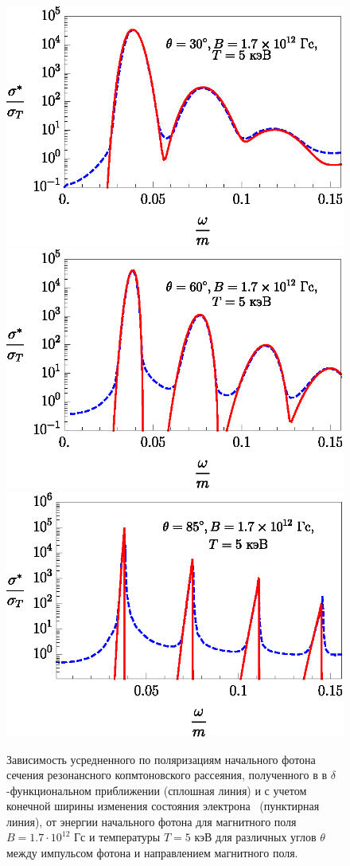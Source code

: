 \documentclass[cp1251%
               ]{jetp} %
\begin{document}
\begin{figure}[t!]\centering
\includegraphics[width=0.9\linewidth,clip]{fig3_1.eps}
\includegraphics[width=0.9\linewidth,clip]{fig3_2.eps}
\includegraphics[width=0.9\linewidth,clip]{fig3_3.eps}
\caption{Зависимость усредненного по поляризациям начального фотона сечения резонансного копмтоновского рассеяния, полученного в в $\delta$-функциональном приближении (сплошная линия) и с учетом конечной ширины изменения состояния электрона~\cite{Harding:1991} (пунктирная линия), от энергии начального фотона для магнитного поля $B = 1.7 \cdot 10^{12}$ Гс и температуры $T=5$ кэВ для различных углов $\theta$ между импульсом фотона и направлением магнитного поля.}
\label{fig3}
\end{figure}
\end{document}
